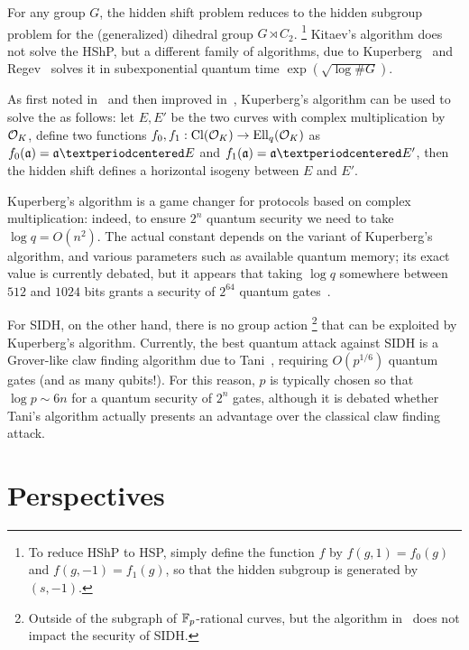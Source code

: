 \documentclass{report}
\theoremstyle{plain}
\theoremstyle{definition}
\begin{document}
For any group $G$, the hidden shift problem reduces to the hidden
subgroup problem for the (generalized) dihedral group $G\rtimes C_2$.%
\footnote{To reduce HShP to HSP, simply define the function $f$ by
  $f(g,1) = f_0(g)$ and $f(g,-1) = f_1(g)$, so that the hidden
  subgroup is generated by $(s,-1)$.} %
Kitaev's algorithm does not solve the HShP, but a different family of
algorithms, due to Kuperberg~\cite{Kup,Kuperberg2013} and
Regev~\cite{regev04} solves it in subexponential quantum time
$\exp(\sqrt{\log\#G})$. %

As first noted in~\cite{childs2014constructing} and then improved
in~\cite{BS18,BIJ18,Jao-etal-kuperberg-2018}, Kuperberg's algorithm
can be used to solve the  as follows: let $E,E'$ be
the two curves with complex multiplication by $\mathcal{O}_K$, define two
functions $f_0,f_1:\operatorname{Cl}(\mathcal{O}_K)\to\operatorname{Ell}_q(\mathcal{O}_K)$ as $f_0(\a)=\a·E$ and
$f_1(\a)=\a·E'$, then the hidden shift defines a horizontal isogeny
between $E$ and $E'$. %

Kuperberg's algorithm is a game changer for protocols based on complex
multiplication: indeed, to ensure $2^n$ quantum security we need to
take $\log q=O(n^2)$. %
The actual constant depends on the variant of Kuperberg's algorithm,
and various parameters such as available quantum memory; its exact
value is currently debated, but it appears that taking $\log q$
somewhere between $512$ and $1024$ bits grants a security of $2^{64}$
quantum gates~\cite{cryptoeprint:2018:383,cryptoeprint:2018:485,BS18}.

For SIDH, on the other hand, there is no group action%
\footnote{Outside of the subgraph of $\mathbb{F}_p$-rational curves, but the
  algorithm in~\cite{biasse2014quantum} does not impact the security
  of SIDH.} %
that can be exploited by Kuperberg's algorithm. %
Currently, the best quantum attack against SIDH is a Grover-like claw
finding algorithm due to Tani~\cite{tani2009claw}, requiring
$O(p^{1/6})$ quantum gates (and as many qubits!). %
For this reason, $p$ is typically chosen so that $\log p\sim 6n$ for a
quantum security of $2^n$ gates, although it is debated whether Tani's
algorithm actually presents an advantage over the classical claw
finding attack.%


\section{Perspectives}
\end{document}
